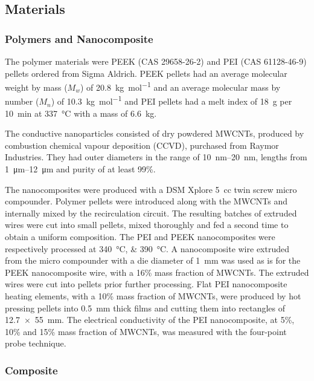 \documentclass[11pt,review,times]{elsarticle}
\begin{document}
\subsection{Materials}

\subsubsection{Polymers and Nanocomposite}

The polymer materials were PEEK (CAS 29658-26-2) and PEI (CAS 61128-46-9) pellets ordered from Sigma Aldrich. 
PEEK pellets had an average molecular weight by mass ($M_w$) of \SI{20,8}{\kilo\gram\per\mol} and an average molecular mass by number ($M_n$) of \SI{10,3}{\kilo\gram\per\mol} and PEI pellets had a melt index of \SI{18}{\gram} per \SI{10}{\minute} at \SI{337}{\celsius} with a mass of \SI{6.6}{\kilogram}. 

The conductive nanoparticles consisted of dry powdered MWCNTs, produced by combustion chemical vapour deposition (CCVD), purchased from Raymor Industries. 
They had outer diameters in the range of \SIrange{10}{20}{\nano\metre}, lengths from \SIrange{1}{12}{\micro\metre} and purity of at least 99\%.

The nanocomposites were produced with a DSM Xplore \SI{5}{cc} twin screw micro compounder. 
Polymer pellets were introduced along with the MWCNTs and internally mixed by the recirculation circuit. 
The resulting batches of extruded wires were cut into small pellets, mixed thoroughly and fed a second time to obtain a uniform composition. 
The PEI and PEEK nanocomposites were respectively processed at \SIlist{340;390}{\celsius}. 
A nanocomposite wire extruded from the micro compounder with a die diameter of \SI{1}{\milli\metre} was used as is for the PEEK nanocomposite wire, with a 16\% mass fraction of MWCNTs. 
The extruded wires were cut into pellets prior further processing. 
Flat PEI nanocomposite heating elements, with a 10\% mass fraction of MWCNTs, were produced by hot pressing pellets into \SI{0.5}{\milli\metre} thick films and cutting them into rectangles of \SI{12.7 x 55}{\milli\metre}. 
The electrical conductivity of the PEI nanocomposite, at 5\%, 10\% and 15\% mass fraction of MWCNTs, was measured with the four-point probe technique. 

\subsubsection{Composite}
\end{document}
